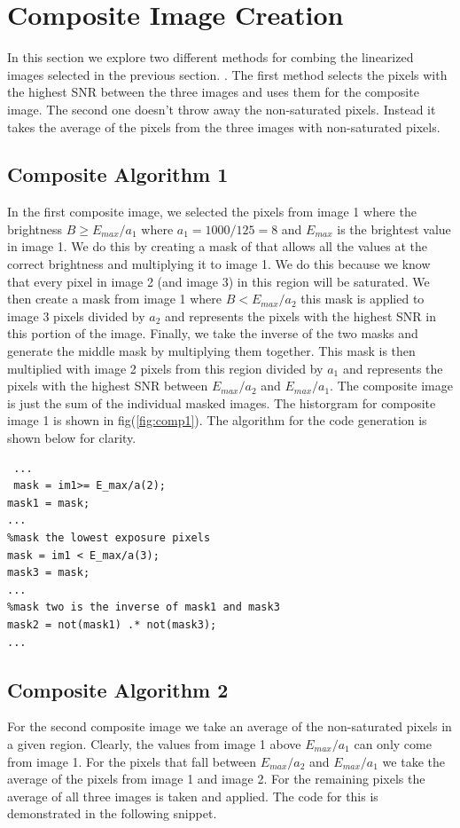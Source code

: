 \documentclass[a4paper]{article}
\begin{document}
\FloatBarrier
\section{Composite Image Creation}
In this section we explore two different methods for combing the linearized images selected in the previous section. .   The first method selects the pixels with the highest SNR between the three images and uses them for the composite image.  The second one doesn't throw away the non-saturated pixels.  Instead it takes the average of the pixels from the three images with non-saturated pixels. 

\subsection{Composite Algorithm 1}
 In the first composite image, we selected the pixels from image 1 where the brightness $B \ge E_{max} /a_1$ where $a_1 = 1000/125 = 8$ and $E_{max}$ is the brightest value in image 1. We do this by creating a mask of that allows all the values at the correct brightness and multiplying it to image 1.  We do this because we know that every pixel in image 2 (and image 3) in this region will be saturated.  We then create a mask from image 1 where $B  <E_{max} /a_2$ this mask is applied to image 3 pixels  divided by $a_2$ and represents the pixels with the highest SNR in this portion of the image.  Finally, we take the inverse of the two masks and generate the middle mask by multiplying them together.  This mask is then multiplied with image 2 pixels from this region divided by $a_1$ and represents the pixels with the highest SNR between $E_{max}/a_{2}$ and $E_{max}/a_1$.  The composite image is just the sum of the individual masked images.  The historgram for composite image 1 is shown in fig(\ref{fig:comp1}). The algorithm for the code generation is shown below for clarity.
 \begin{verbatim}
 ...
 mask = im1>= E_max/a(2);
mask1 = mask;
...
%mask the lowest exposure pixels
mask = im1 < E_max/a(3);
mask3 = mask;
...
%mask two is the inverse of mask1 and mask3
mask2 = not(mask1) .* not(mask3);
...
 \end{verbatim}

\FloatBarrier
\subsection{Composite Algorithm 2}
For the second composite image we take an average of the non-saturated pixels in a given region.  Clearly, the values from image 1 above $E_{max}/a_1$ can only come from image 1.  For the pixels that fall between  $E_{max}/a_{2}$ and $E_{max}/a_1$ we take the average of the pixels from image 1 and image 2.  For the remaining pixels the average of all three images is taken and applied.  The code for this is demonstrated in the following snippet.
\end{document}
